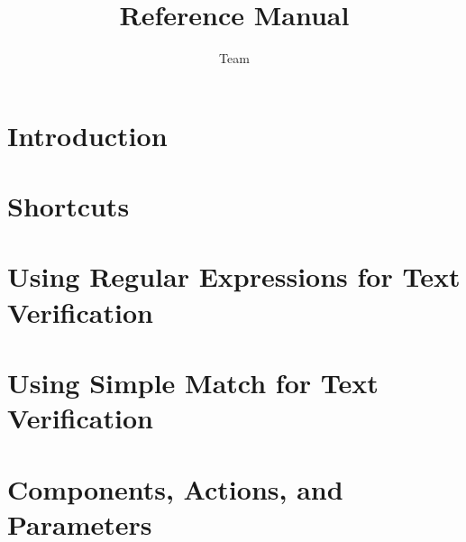 
\title{\app{} Reference Manual}
\author*{\app{} Team}{}
\maketitle

\tableofcontents
\renewcommand{\bxcomment}[2]{}%
\clearpage

\chapter{Introduction}

\clearpage

\chapter{Shortcuts}

\clearpage

\chapter{Using Regular Expressions for Text Verification}
\label{regex}

\clearpage

\chapter{Using Simple Match for Text Verification}
\label{simplematch}

\clearpage

\chapter{Components, Actions, and Parameters}
 \label{actparam}
 
 \clearpage

